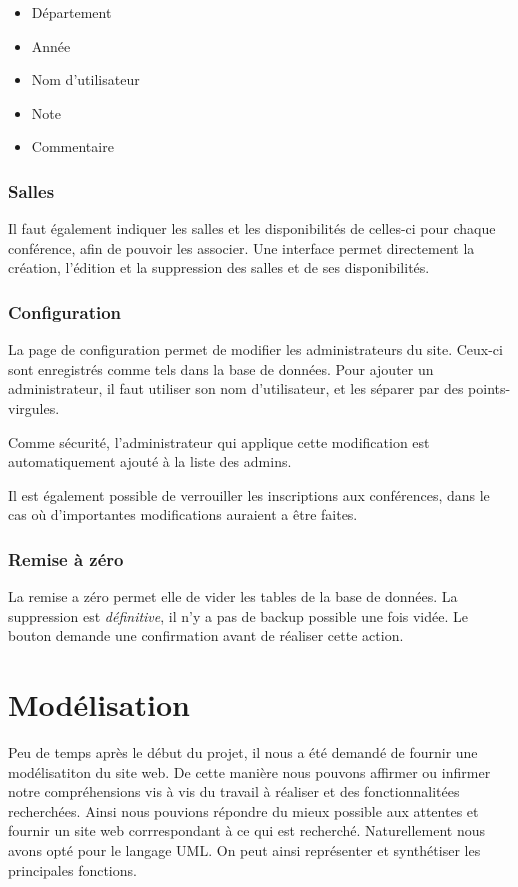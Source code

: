     \begin{itemize}
    \item Département
    \item Année
    \item Nom d'utilisateur
    \item Note
    \item Commentaire
    \end{itemize}

            \subsubsection{Salles}

Il faut également indiquer les salles et les disponibilités de celles-ci pour chaque conférence, afin de pouvoir les associer.
Une interface permet directement la création, l'édition et la suppression des salles et de ses disponibilités.

            \subsubsection{Configuration}

La page de configuration permet de modifier les administrateurs du site. Ceux-ci sont enregistrés comme tels dans la base de données.
Pour ajouter un administrateur, il faut utiliser son nom d'utilisateur, et les séparer par des points-virgules.

Comme sécurité, l'administrateur qui applique cette modification est automatiquement ajouté à la liste des admins.

Il est également possible de verrouiller les inscriptions aux conférences, dans le cas où d'importantes modifications
auraient a être faites.

            \subsubsection{Remise à zéro}
La remise a zéro permet elle de vider les tables de la base de données. La suppression est \emph{définitive}, il n'y a pas de
backup possible une fois vidée. Le bouton demande une confirmation avant de réaliser cette action.

    \section{Modélisation}
Peu de temps après le début du projet, il nous a été demandé de fournir une modélisatiton du site web. De cette manière
nous pouvons affirmer ou infirmer notre compréhensions vis à vis du travail à réaliser et des fonctionnalitées recherchées.
Ainsi nous pouvions répondre du mieux possible aux attentes et fournir un site web corrrespondant à ce qui est recherché.
Naturellement nous avons opté pour le langage UML. On peut ainsi représenter et synthétiser les principales fonctions.

